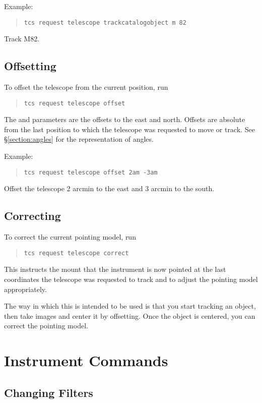 Example:

\begin{quote}
\verb|tcs request telescope trackcatalogobject m 82|
\end{quote}
Track M82.

\subsection{Offsetting}

To offset the telescope from the current position, run
\begin{quote}
\verb|tcs request telescope offset|  
\end{quote}
The  and  parameters are the offsets to the east and north. Offsets are absolute from the last position to which the telescope was requested to move or track. See \S\ref{section:angles} for the representation of angles.

Example:

\begin{quote}
\verb|tcs request telescope offset 2am -3am|
\end{quote}
Offset the telescope 2 arcmin to the east and 3 arcmin to the south.

\subsection{Correcting}

To correct the current pointing model, run
\begin{quote}
\verb|tcs request telescope correct|
\end{quote}
This instructs the mount that the instrument is now pointed at the last coordinates the telescope was requested to track and to adjust the pointing model appropriately.

The way in which this is intended to be used is that you start tracking an object, then take images and center it by offsetting. Once the object is centered, you can correct the pointing model.

\section{Instrument Commands}

\subsection{Changing Filters}

